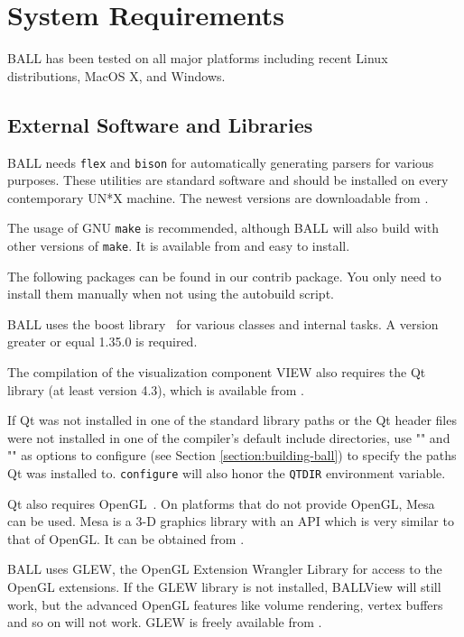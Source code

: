 \section{System Requirements}
\label{requirements}

BALL has been tested on all major platforms including recent Linux distributions, MacOS X, and Windows.


\subsection{External Software and Libraries}

BALL needs {\tt flex} and {\tt bison} for automatically generating parsers
for various purposes. These utilities are standard software and should be
installed on every contemporary UN*X machine. The newest versions are
downloadable from .

The usage of GNU {\tt make} is recommended, although BALL will also build with
other versions of {\tt make}. It is available from 
and easy to install.

The following packages can be found in our contrib package. You only need to install
them manually when not using the autobuild script.

BALL uses the boost library~\cite{boost} for various classes and internal tasks. A version greater 
or equal 1.35.0 is required.


The compilation of the visualization component VIEW also requires the Qt 
library (at least version 4.3), which is available from
.

If Qt was not installed in one of the standard library paths or the
Qt header files were not installed in one of the compiler's default
include directories, use \mbox{""} and
\mbox{""} as options to configure (see
Section \ref{section:building-ball}) to specify the paths Qt was installed
to. {\tt configure} will also honor the {\tt QTDIR} environment variable.

Qt also requires OpenGL~\cite{OpenGL}. On platforms that do not provide OpenGL,
Mesa~\cite{Mesa} can be used. Mesa is a 3-D graphics library with an API which
is very similar to that of OpenGL. It can be obtained from 
.

BALL uses GLEW, the OpenGL Extension Wrangler Library for access to the OpenGL
extensions. If the GLEW library is not installed, BALLView will still work, but
the advanced OpenGL features like volume rendering, vertex buffers and so on
will not work. GLEW is freely available from .

